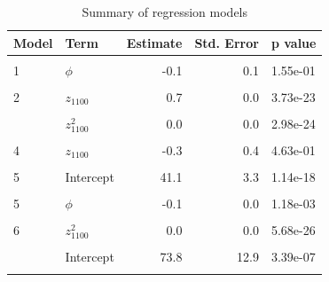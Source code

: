 \documentclass[draft,linenumbers]{agujournal2018} %
\begin{document}
\begin{table}

\caption{\label{tab:reg.summary}Summary of regression models}
\centering
\fontsize{8}{10}\selectfont
\begin{threeparttable}
\begin{tabular}[t]{llrrl}
\toprule
Model & Term & Estimate & Std. Error & p value\\
\midrule
\cellcolor{gray!6}{1} & \cellcolor{gray!6}{Intercept} & \cellcolor{gray!6}{89.4} & \cellcolor{gray!6}{3.7} & \cellcolor{gray!6}{2.24e-33}\\
1 & $\phi$ & -0.1 & 0.1 & 1.55e-01\\
\cellcolor{gray!6}{2} & \cellcolor{gray!6}{Intercept} & \cellcolor{gray!6}{36.4} & \cellcolor{gray!6}{3.2} & \cellcolor{gray!6}{7.15e-17}\\
2 & $z_{1100}$ & 0.7 & 0.0 & 3.73e-23\\
\cellcolor{gray!6}{3} & \cellcolor{gray!6}{Intercept} & \cellcolor{gray!6}{58.9} & \cellcolor{gray!6}{1.7} & \cellcolor{gray!6}{1.43e-41}\\
\addlinespace
3 & $z_{1100}^2$ & 0.0 & 0.0 & 2.98e-24\\
\cellcolor{gray!6}{4} & \cellcolor{gray!6}{Intercept} & \cellcolor{gray!6}{69.2} & \cellcolor{gray!6}{14.0} & \cellcolor{gray!6}{6.25e-06}\\
4 & $z_{1100}$ & -0.3 & 0.4 & 4.63e-01\\
\cellcolor{gray!6}{4} & \cellcolor{gray!6}{$z_{1100}^2$} & \cellcolor{gray!6}{0.0} & \cellcolor{gray!6}{0.0} & \cellcolor{gray!6}{1.95e-02}\\
5 & Intercept & 41.1 & 3.3 & 1.14e-18\\
\addlinespace
\cellcolor{gray!6}{5} & \cellcolor{gray!6}{$z_{1100}$} & \cellcolor{gray!6}{0.7} & \cellcolor{gray!6}{0.0} & \cellcolor{gray!6}{1.12e-24}\\
5 & $\phi$ & -0.1 & 0.0 & 1.18e-03\\
\cellcolor{gray!6}{6} & \cellcolor{gray!6}{Intercept} & \cellcolor{gray!6}{63.6} & \cellcolor{gray!6}{2.1} & \cellcolor{gray!6}{8.29e-39}\\
6 & $z_{1100}^2$ & 0.0 & 0.0 & 5.68e-26\\
\cellcolor{gray!6}{6} & \cellcolor{gray!6}{$\phi$} & \cellcolor{gray!6}{-0.1} & \cellcolor{gray!6}{0.0} & \cellcolor{gray!6}{6.98e-04}\\
\addlinespace
7 & Intercept & 73.8 & 12.9 & 3.39e-07\\
\cellcolor{gray!6}{7} & \cellcolor{gray!6}{$z_{1100}$} & \cellcolor{gray!6}{-0.3} & \cellcolor{gray!6}{0.4} & \cellcolor{gray!6}{4.23e-01}\\

\end{tabular}
\end{threeparttable}
\end{table}
\end{document}
